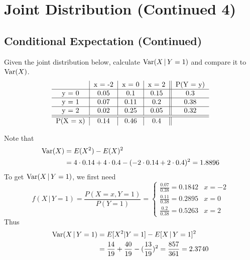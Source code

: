 \documentclass[notoc,notitlepage]{tufte-book}
\begin{document}
\section{Joint Distribution (Continued 4)}%
\label{sec:joint_distribution_continued_4}

\subsection{Conditional Expectation (Continued)}%
\label{sub:conditional_expectation_continued}

\begin{eg}[Example 3.22]
  Given the joint distribution below, calculate $\operatorname{Var}(X \, | \, Y = 1)$ and compare it to $\operatorname{Var}(X)$.
  \[
  \begin{tabular}{c | c | c | c || c}
            & x = -2 & x = 0 & x = 2 & P(Y = y) \\
  \hline
  y = 0     & 0.05   & 0.1   & 0.15  & 0.3 \\
  \hline
  y = 1     & 0.07   & 0.11  & 0.2   & 0.38 \\
  \hline
  y = 2     & 0.02   & 0.25  & 0.05  & 0.32 \\
  \hline
  \hline
  P(X = x)  & 0.14   & 0.46  & 0.4   &
  \end{tabular}
  \]
\end{eg}

\begin{solution}
  Note that
  \begin{align*}
    \operatorname{Var}(X) &= E(X^2) - E(X)^2 \\
      &= 4 \cdot 0.14 + 4 \cdot 0.4 - ( -2 \cdot 0.14 + 2 \cdot 0.4 )^2 = 1.8896
  \end{align*}
  To get $\operatorname{Var}(X \, | \, Y = 1)$, we first need
  \begin{equation*}
    f(X \, | \, Y = 1) = \frac{P(X = x, Y = 1)}{P(Y = 1)} = \begin{cases}
      \frac{0.07}{0.38} = 0.1842 & x = -2 \\
      \frac{0.11}{0.38} = 0.2895 & x = 0 \\
      \frac{0.2}{0.38} = 0.5263 & x = 2
    \end{cases}
  \end{equation*}
  Thus
  \begin{align*}
    \operatorname{Var}(X \, | \, Y = 1) &= E[ X^2 | Y = 1 ] - E[ X \, | \, Y = 1 ]^2 \\
      &= \frac{14}{19} + \frac{40}{19} - ( \frac{13}{19} )^2 = \frac{857}{361} = 2.3740
  \end{align*}
\end{solution}
\end{document}
